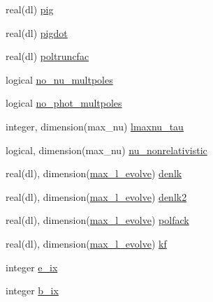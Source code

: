 \begin{DoxyCompactItemize}
\item 
real(dl) \mbox{\hyperlink{structgaugeinterface_1_1evolutionvars_a5c755b6291c7216bbd78abe6ff57d22b}{pig}}
\item 
real(dl) \mbox{\hyperlink{structgaugeinterface_1_1evolutionvars_a863cbcd64f8d3703fbbc758991009631}{pigdot}}
\item 
real(dl) \mbox{\hyperlink{structgaugeinterface_1_1evolutionvars_aeaa8010474c0155a8df8a9780e9c22b8}{poltruncfac}}
\item 
logical \mbox{\hyperlink{structgaugeinterface_1_1evolutionvars_aa8f6cd9dbba8c029332f6f84105c4e11}{no\+\_\+nu\+\_\+multpoles}}
\item 
logical \mbox{\hyperlink{structgaugeinterface_1_1evolutionvars_a6018f6120147ee191b8a3cc134bf2ed3}{no\+\_\+phot\+\_\+multpoles}}
\item 
integer, dimension(max\+\_\+nu) \mbox{\hyperlink{structgaugeinterface_1_1evolutionvars_a961c96e0f3fcb0e6e8221fc6bd798148}{lmaxnu\+\_\+tau}}
\item 
logical, dimension(max\+\_\+nu) \mbox{\hyperlink{structgaugeinterface_1_1evolutionvars_a7f1a3be8529d6ee5da720d74c23e7cda}{nu\+\_\+nonrelativistic}}
\item 
real(dl), dimension(\mbox{\hyperlink{namespacegaugeinterface_a965f8caba9ba282e718281110e274b04}{max\+\_\+l\+\_\+evolve}}) \mbox{\hyperlink{structgaugeinterface_1_1evolutionvars_af4aa331dbe72af6e9ce44a5915887cdd}{denlk}}
\item 
real(dl), dimension(\mbox{\hyperlink{namespacegaugeinterface_a965f8caba9ba282e718281110e274b04}{max\+\_\+l\+\_\+evolve}}) \mbox{\hyperlink{structgaugeinterface_1_1evolutionvars_abb5cfd3a8a06785ccf6038b63970fcc6}{denlk2}}
\item 
real(dl), dimension(\mbox{\hyperlink{namespacegaugeinterface_a965f8caba9ba282e718281110e274b04}{max\+\_\+l\+\_\+evolve}}) \mbox{\hyperlink{structgaugeinterface_1_1evolutionvars_adcf371278832c17c1efb9d1533fe3648}{polfack}}
\item 
real(dl), dimension(\mbox{\hyperlink{namespacegaugeinterface_a965f8caba9ba282e718281110e274b04}{max\+\_\+l\+\_\+evolve}}) \mbox{\hyperlink{structgaugeinterface_1_1evolutionvars_aeca3a9dc3f2ab1519b9b665d96ae9754}{kf}}
\item 
integer \mbox{\hyperlink{structgaugeinterface_1_1evolutionvars_ace6745992bda4da4ab25b0a28af6e144}{e\+\_\+ix}}
\item 
integer \mbox{\hyperlink{structgaugeinterface_1_1evolutionvars_a4ff42cff96d4117cf7c8779b89bfd4a2}{b\+\_\+ix}}
\item 

\end{DoxyCompactItemize}
